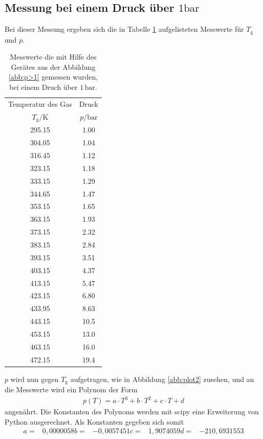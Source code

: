 \subsection{Messung bei einem Druck über $1\si{\bar}$}
Bei dieser Messung ergeben sich die in Tabelle \ref{tab:p>1} aufgelisteten Messwerte für $T_\mathrm{g}$ und $p$.
\begin{table}   %
  \centering
  \caption{Messwerte die mit Hilfe des Gerätes aus der Abbildung \ref{abb:p>1} gemessen wurden, bei einem Druch über $1\,\si{\bar}$.}
  \label{tab:p>1}
  \begin{tabular}{c c}
    \toprule
    Temperatur des Gas &  Druck \\
    $T_\mathrm{g}/ \si{\kelvin}$ & $p/\si{\bar} $ \\
    \midrule
    295.15 & 1.00\\
    304.05 & 1.04\\
    316.45 & 1.12\\
    323.15 & 1.18\\
    333.15 & 1.29\\
    344.65 & 1.47\\
    353.15 & 1.65\\
    363.15 & 1.93\\
    373.15 & 2.32\\
    383.15 & 2.84\\
    393.15 & 3.51\\
    403.15 & 4.37\\
    413.15 & 5.47\\
    423.15 & 6.80\\
    433.95 & 8.63\\
    443.15 & 10.5\\
    453.15 & 13.0\\
    463.15 & 16.0\\
    472.15 & 19.4\\
    \bottomrule
  \end{tabular}
\end{table}
$p$ wird nun gegen $T_\mathrm{g}$ aufgetragen, wie in Abbildung \ref{abb:plot2} zusehen, und an die Messwerte wird ein Polynom
der Form
\begin{align*}
p(T)=a\cdot T^3+b\cdot T^2 + c\cdot T + d
\end{align*}
angenährt.
Die Konstanten des Polynoms werden mit scipy eine Erweiterung von Python ausgerechnet. Als Konstanten gegeben sich somit
\begin{align*}
  a =&0,0000058
  b =&-0,0057451
  c =&1,9074059
  d =&-210,6931553
\end{align*}
